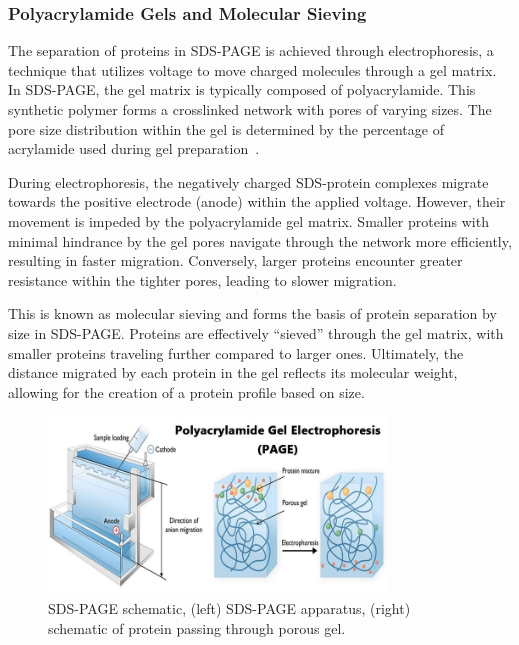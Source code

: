 \subsubsection{Polyacrylamide Gels and Molecular Sieving}

The separation of proteins in SDS-PAGE is achieved through electrophoresis, a technique
that utilizes voltage to move charged molecules through a gel matrix. In SDS-PAGE, the
gel matrix is typically composed of polyacrylamide. This synthetic polymer forms a crosslinked network with pores of varying sizes. The pore size distribution within the gel is
determined by the percentage of acrylamide used during gel preparation~\cite{sdsgelsieving}.

During electrophoresis, the negatively charged SDS-protein complexes migrate towards
the positive electrode (anode) within the applied voltage. However, their movement is
impeded by the polyacrylamide gel matrix. Smaller proteins with minimal hindrance by
the gel pores navigate through the network more efficiently, resulting in faster migration.
Conversely, larger proteins encounter greater resistance within the tighter pores, leading
to slower migration.

This is known as molecular sieving and forms the basis of protein separation by size in
SDS-PAGE. Proteins are effectively ``sieved'' through the gel matrix, with smaller proteins
traveling further compared to larger ones. Ultimately, the distance migrated by each
protein in the gel reflects its molecular weight, allowing for the creation of a protein
profile based on size.

\begin{figure}[H]
    \centering
    \includegraphics[width=0.8\textwidth]{./media/images/sds_schematic}
    \caption{SDS-PAGE schematic, (left) SDS-PAGE apparatus, (right) schematic of protein passing through porous gel.}
    \label{fig:sds_schematic}
\end{figure}

